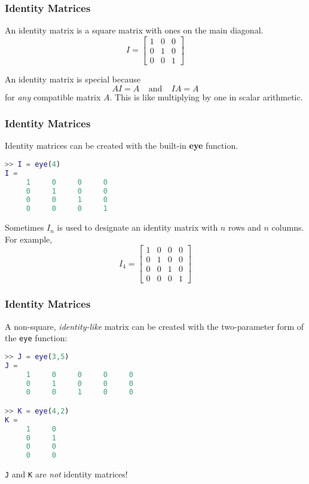\documentclass[10pt]{beamer}
\begin{document}
\begin{frame}
\frametitle{Identity Matrices}

An identity matrix is a square matrix with ones on the main diagonal.
\begin{equation*}
    I = \begin{bmatrix}1 & 0 & 0\\ 0 & 1 & 0 \\ 0 & 0 & 1 \end{bmatrix}
\end{equation*}

An identity matrix is special because
\begin{equation*}
    AI = A
    \ \ \ \ \ \text{and}\ \ \ \ \
    IA = A
\end{equation*}
for \emph{any} compatible matrix $A$.  This is like multiplying by
one in scalar arithmetic.


\end{frame}
\begin{frame}[fragile]
\frametitle{Identity Matrices}

Identity matrices can be created with the built-in \textbf{eye} function.
\begin{lstlisting}[language=matlab]
>> I = eye(4)
I =
     1     0     0     0
     0     1     0     0
     0     0     1     0
     0     0     0     1
\end{lstlisting}

Sometimes $I_n$ is used to designate an identity matrix with $n$ rows
and $n$ columns.  For example,
\begin{equation*}
    I_4 = \begin{bmatrix}  1 & 0 & 0 & 0 \\
                           0 & 1 & 0 & 0 \\
                           0 & 0 & 1 & 0 \\
                           0 & 0 & 0 & 1 \end{bmatrix}
\end{equation*}

\end{frame}
\begin{frame}[fragile]
\frametitle{Identity Matrices}

A non-square, \emph{identity-like} matrix can be created with the
two-parameter form of the \texttt{eye} function:
\begin{lstlisting}[language=matlab]
>> J = eye(3,5)
J =
     1     0     0     0     0
     0     1     0     0     0
     0     0     1     0     0

>> K = eye(4,2)
K =
     1     0
     0     1
     0     0
     0     0
\end{lstlisting}
\texttt{J} and \texttt{K} are \emph{not} identity matrices!


\end{frame}
\end{document}
